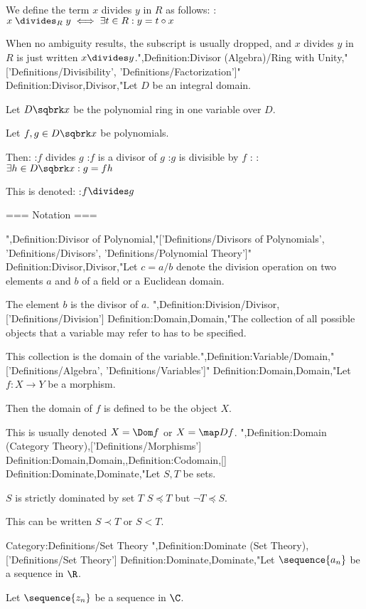 We define the term $x$ divides $y$ in $R$ as follows:
:$x \mathrel {\divides_R} y \iff \exists t \in R: y = t \circ x$


When no ambiguity results, the subscript is usually dropped, and $x$ divides $y$ in $R$ is just written $x \divides y$.",Definition:Divisor (Algebra)/Ring with Unity,"['Definitions/Divisibility', 'Definitions/Factorization']"
Definition:Divisor,Divisor,"Let $D$ be an integral domain.

Let $D \sqbrk x$ be the polynomial ring in one variable over $D$.

Let $f, g \in D \sqbrk x$ be polynomials.


Then:
:$f$ divides $g$
:$f$ is a divisor of $g$
:$g$ is divisible by $f$
:
:$\exists h \in D \sqbrk x : g = f h$


This is denoted:
:$f \divides g$


=== Notation ===

",Definition:Divisor of Polynomial,"['Definitions/Divisors of Polynomials', 'Definitions/Divisors', 'Definitions/Polynomial Theory']"
Definition:Divisor,Divisor,"Let $c = a / b$ denote the division operation on two elements $a$ and $b$ of a field or a Euclidean domain.

The element $b$ is the divisor of $a$.
",Definition:Division/Divisor,['Definitions/Division']
Definition:Domain,Domain,"The collection of all possible objects that a variable may refer to has to be specified.

This collection is the domain of the variable.",Definition:Variable/Domain,"['Definitions/Algebra', 'Definitions/Variables']"
Definition:Domain,Domain,"Let $f: X \to Y$ be a morphism.

Then the domain of $f$ is defined to be the object $X$.

This is usually denoted $X = \Dom f$ or $X = \map D f$.
",Definition:Domain (Category Theory),['Definitions/Morphisms']
Definition:Domain,Domain,,Definition:Codomain,[]
Definition:Dominate,Dominate,"Let $S, T$ be sets.


$S$ is strictly dominated by set $T$  $S \preccurlyeq T$ but $\neg T \preccurlyeq S$.

This can be written $S \prec T$ or $S < T$.


Category:Definitions/Set Theory
",Definition:Dominate (Set Theory),['Definitions/Set Theory']
Definition:Dominate,Dominate,"Let $\sequence {a_n}$ be a sequence in $\R$.

Let $\sequence {z_n}$ be a sequence in $\C$.


